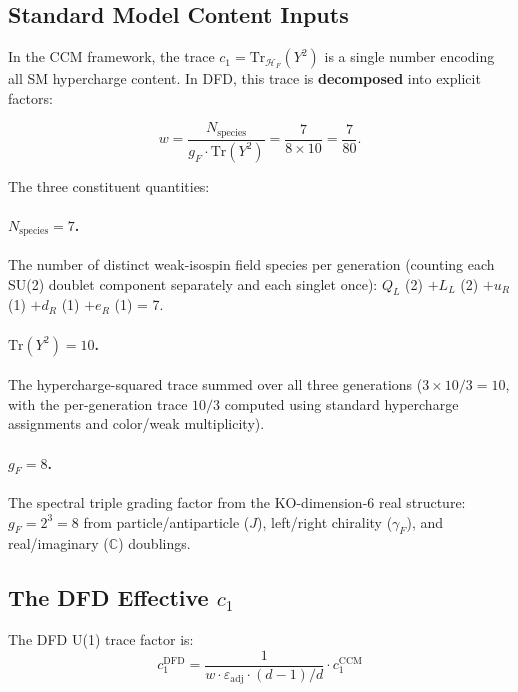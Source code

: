 \documentclass[12pt,a4paper]{article}
\begin{document}
\subsection{Standard Model Content Inputs}

In the CCM framework, the trace $c_1 = \mathrm{Tr}_{\mathcal{H}_F}(Y^2)$
is a single number encoding all SM hypercharge content.  In DFD, this
trace is \textbf{decomposed} into explicit factors:

\begin{equation}\label{eq:w-definition}
w = \frac{N_{\mathrm{species}}}{g_F \cdot \mathrm{Tr}(Y^2)}
= \frac{7}{8 \times 10} = \frac{7}{80}.
\end{equation}

The three constituent quantities:

\paragraph{$N_{\mathrm{species}} = 7$.}
The number of distinct weak-isospin field species per generation
(counting each SU(2) doublet component separately and each singlet once):
$Q_L$ (2) $+ L_L$ (2) $+ u_R$ (1) $+ d_R$ (1) $+ e_R$ (1) = 7.

\paragraph{$\mathrm{Tr}(Y^2) = 10$.}
The hypercharge-squared trace summed over all three generations
($3 \times 10/3 = 10$, with the per-generation trace $10/3$ computed
using standard hypercharge assignments and color/weak multiplicity).

\paragraph{$g_F = 8$.}
The spectral triple grading factor from the KO-dimension-6 real
structure: $g_F = 2^3 = 8$ from particle/antiparticle ($J$),
left/right chirality ($\gamma_F$), and real/imaginary ($\mathbb{C}$) doublings.

\subsection{The DFD Effective $c_1$}

The DFD U(1) trace factor is:
\begin{equation}\label{eq:c1-dfd}
\boxed{
c_1^{\mathrm{DFD}} = \frac{1}{w \cdot \varepsilon_{\mathrm{adj}}
\cdot (d{-}1)/d}
\cdot c_1^{\mathrm{CCM}}
}
\end{equation}
\end{document}
